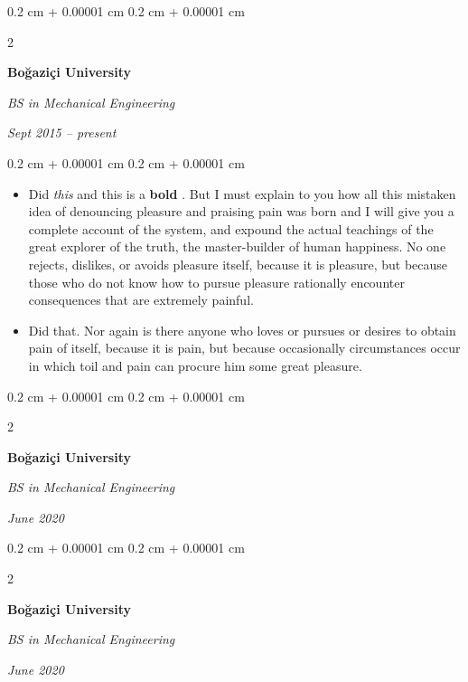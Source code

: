 \documentclass[10pt, letterpaper]{article}
\newenvironment{highlights}{
    \begin{itemize}[
        topsep=0.10 cm,
        parsep=0.10 cm,
        partopsep=0pt,
        itemsep=0pt,
        leftmargin=0.4 cm + 10pt
    ]
}{
    \end{itemize}
} %
\newenvironment{onecolentry}{
    \begin{adjustwidth}{
        0.2 cm + 0.00001 cm
    }{
        0.2 cm + 0.00001 cm
    }
}{
    \end{adjustwidth}
} %
\newenvironment{twocolentry}[2][]{
    \onecolentry
    \def\secondColumn{#2}
    \setcolumnwidth{\fill, 4.5 cm}
    \begin{paracol}{2}
}{
    \switchcolumn \raggedleft \secondColumn
    \end{paracol}
    \endonecolentry
} %
\let\hrefWithoutArrow\href
\renewcommand{\href}[2]{\hrefWithoutArrow{#1}{\ifthenelse{\equal{#2}{}}{ }{#2 }\raisebox{.15ex}{\footnotesize \faExternalLink*}}}
\begin{document}
        \vspace{0.2 cm}

        \begin{twocolentry}{
            
            
        \textit{Sept 2015 – present}}
            \textbf{Boğaziçi University}

            \textit{BS in Mechanical Engineering}
        \end{twocolentry}

        \vspace{0.10 cm}
        \begin{onecolentry}
            \begin{highlights}
                \item Did \textit{this} and this is a \textbf{bold} \href{https://example.com}{link}. But I must explain to you how all this mistaken idea of denouncing pleasure and praising pain was born and I will give you a complete account of the system, and expound the actual teachings of the great explorer of the truth, the master-builder of human happiness. No one rejects, dislikes, or avoids pleasure itself, because it is pleasure, but because those who do not know how to pursue pleasure rationally encounter consequences that are extremely painful.
                \item Did that. Nor again is there anyone who loves or pursues or desires to obtain pain of itself, because it is pain, but because occasionally circumstances occur in which toil and pain can procure him some great pleasure.
            \end{highlights}
        \end{onecolentry}


        \vspace{0.2 cm}

        \begin{twocolentry}{
            
            
        \textit{June 2020}}
            \textbf{Boğaziçi University}

            \textit{BS in Mechanical Engineering}
        \end{twocolentry}



        \vspace{0.2 cm}

        \begin{twocolentry}{
            
            
        \textit{June 2020}}
            \textbf{Boğaziçi University}

            \textit{BS in Mechanical Engineering}
        \end{twocolentry}
\end{document}
